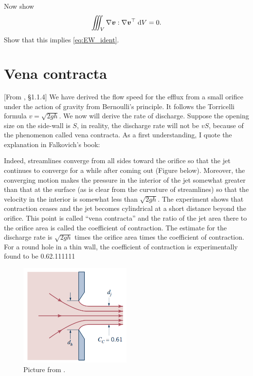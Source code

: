 \documentclass[11pt,letterpaper]{article}
\begin{document}
\subsection{}
Now show
\begin{align}
    \iiint_V \nabla \boldsymbol{v}:\nabla\boldsymbol{v}^\top \;\mathrm{d} V = 0.
\end{align}
Show that this implies \eqref{eq:EW_ident}.

\newpage
\section{Vena contracta}
[From \cite{Falkovich_18}, \S 1.1.4] We have derived the flow speed for the efflux from a small orifice under the action of gravity from Bernoulli's principle. It follows the Torricelli formula $v = \sqrt{2gh}$. We now will derive the rate of discharge. Suppose the opening size on the side-wall is $S$, in reality, the discharge rate will not be $vS$, because of the phenomenon called vena contracta. As a first understanding, I quote the explanation in Falkovich's book:
\begin{displayquote}
    Indeed, streamlines converge from all sides toward the orifice so that the jet continues to converge for a while after coming out (Figure below). Moreover, the converging motion makes the pressure in the interior of the jet somewhat greater than that at the surface (as is clear from the curvature of streamlines) so that the velocity in the interior is somewhat less than $\sqrt{2gh}$. The experiment shows that contraction ceases and the jet becomes cylindrical at a short distance beyond the orifice. This point is called ``vena contracta'' and the ratio of the jet area there to the orifice area is called the coefficient of contraction. The estimate for the discharge rate is $\sqrt{2gh}$ times the orifice area times the coefficient of contraction. For a round hole in a thin wall, the coefficient of contraction is experimentally found to be 0.62.111111
\end{displayquote}
\begin{figure}[H]
    \centering
    \includegraphics[width=0.5\textwidth]{figs/vena_contracta}
    \caption{Picture from \cite{GerhartEtAl_20}.}
\end{figure}
\end{document}

